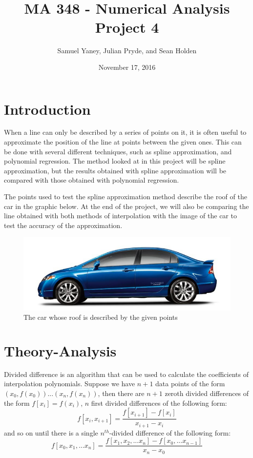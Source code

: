 \documentclass[12pt, letterpaper]{article} %
\begin{document}
\title{MA 348 - Numerical Analysis \\ Project 4}
\author{Samuel Yaney, Julian Pryde, and Sean Holden}
\date{November 17, 2016}
\maketitle

\section*{Introduction}


When a line can only be described by a series of points on it, it is often useful to approximate the position of the line at points between the given ones. This can be done with several different techniques, such as spline approximation, and polynomial regression. The method looked at in this project will be spline approximation, but the results obtained with spline approximation will be compared with those obtained with polynomial regression.

The points used to test the spline approximation method describe the roof of the car in the graphic below. At the end of the project, we will also be comparing the line obtained with both methods of interpolation with the image of the car to test the accuracy of the approximation.

\begin{center}
	\begin{figure}
		\includegraphics[scale=0.5]{Car.png}
		\caption{The car whose roof is described by the given points}
	\end{figure}
\end{center}

\section*{Theory-Analysis}
Divided difference is an algorithm that can be used to calculate the coefficients of interpolation polynomials.  Suppose we have $n+1$ data points of the form $(x_0, f(x_0)) ... (x_n, f(x_n))$, then there are $n+1$ zeroth divided differences of the form $f[x_i]=f(x_i)$, $n$ first divided differences of the following form:
\[f[x_i, x_{i+1}]=\dfrac{f[x_{i+1}] - f[x_i]}{x_{i+1} - x_i}\]
and so on until there is a single $n^{th}$-divided difference of the following form:
\[f[x_0, x_1, ...x _n]=\dfrac{f[x_1, x_2, ... x_n] - f[x_0, ... x_{n-1}]}{x_n - x_0}\]
\end{document}
